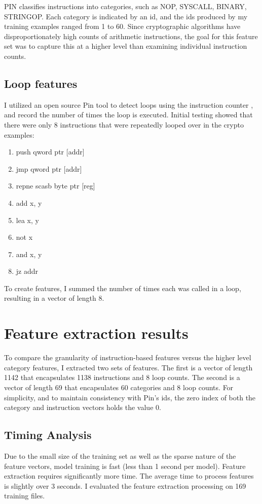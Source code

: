 PIN classifies instructions into categories, such as NOP, SYSCALL, BINARY, STRINGOP.  Each category is indicated by an id, and the ids produced by my training examples ranged from 1 to 60.  Since cryptographic algorithms have disproportionately high counts of arithmetic instructions, the goal for this feature set was to capture this at a higher level than examining individual instruction counts.


\subsection{Loop features}
I utilized an open source Pin tool to detect loops using the instruction counter \cite{simpleloop}, and record the number of times the loop is executed.  Initial testing showed that there were only 8 instructions that were repeatedly looped over in the crypto examples:
\begin{enumerate}
	\item push qword ptr [addr]
	\item jmp qword ptr [addr]
	\item repne scasb byte ptr [reg]
	\item add x, y
	\item lea x, y
	\item not x
	\item and x, y
	\item jz addr	
\end{enumerate}

To create features, I summed the number of times each was called in a loop, resulting in a vector of length 8.

\section{Feature extraction results}
To compare the granularity of instruction-based features versus the higher level category features, I extracted two sets of features.  The first is a vector of length 1142 that encapsulates 1138 instructions and 8 loop counts.  The second is a vector of length 69 that encapsulates 60 categories and 8 loop counts.  For simplicity, and to maintain consistency with Pin's ids, the zero index of both the category and instruction vectors holds the value 0.

\subsection{Timing Analysis}
Due to the small size of the training set as well as the sparse nature of the feature vectors, model training is fast (less than 1 second per model).  Feature extraction requires significantly more time.  The average time to process features is slightly over 3 seconds.  I evaluated the feature extraction processing on 169 training files.


